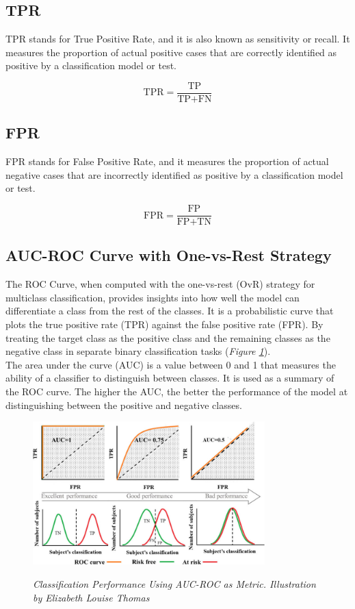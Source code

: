 \subsection{TPR}

TPR stands for True Positive Rate, and it is also known as sensitivity or recall.
It measures the proportion of actual positive cases that are correctly identified as positive
by a classification model or test.

\[
\text{TPR} = \frac{\text{TP}}{\text{TP} + \text{FN}}
\]

\subsection{FPR}

FPR stands for False Positive Rate, and it measures the proportion of actual negative cases that are incorrectly identified as positive by a classification model or test.

\[
\text{FPR} = \frac{\text{FP}}{\text{FP} + \text{TN}}
\]

\subsection{AUC-ROC Curve with One-vs-Rest Strategy}

The ROC Curve, when computed with the one-vs-rest (OvR) strategy for multiclass classification,
provides insights into how well the model can differentiate a class from the rest of the classes.
It is a probabilistic curve that plots the true positive rate (TPR) against the false positive rate (FPR).
By treating the target class as the positive class and the remaining classes as the negative class
in separate binary classification tasks (\textit{Figure \ref{fig:auc-roc}}). \\

The area under the curve (AUC) is a value between 0 and 1 that measures
the ability of a classifier to distinguish between classes. It is used as a summary
of the ROC curve. The higher the AUC, the better the performance of the
model at distinguishing between the positive and negative classes.

\newpage

\begin{figure}[H]
\centering
\includegraphics[width=0.8\textwidth]{imatges/preliminaries/auc.png}
    \caption[Classification Performance Using AUC-ROC as Metric]{\textit{Classification Performance Using AUC-ROC as Metric. Illustration by Elizabeth Louise Thomas}}
{\label{fig:auc-roc}}
\end{figure}


